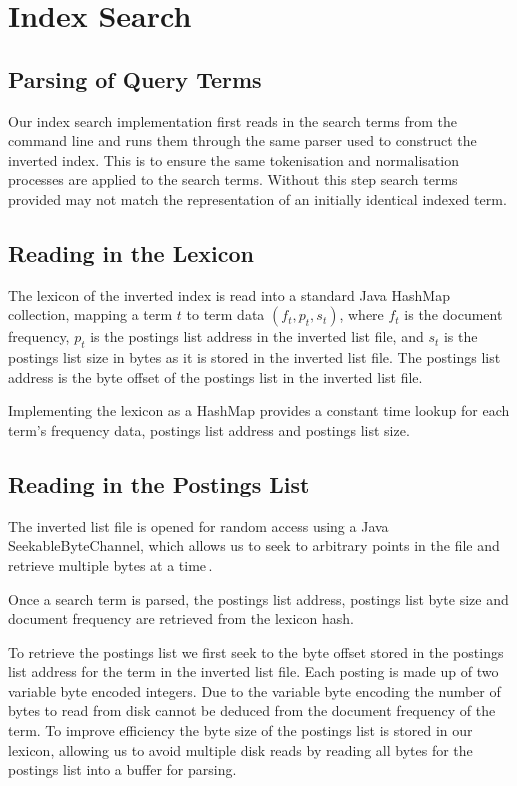 
\section{Index Search}
\label{sec:querying}

\subsection*{Parsing of Query Terms}

Our index search implementation first reads in the search terms from the command line and runs them through the same parser used to construct the inverted index. This is to ensure the same tokenisation and normalisation processes are applied to the search terms. Without this step search terms provided may not match the representation of an initially identical indexed term.

\subsection*{Reading in the Lexicon}

The lexicon of the inverted index is read into a standard Java HashMap collection, mapping a term $t$ to term data $(f_t, p_t, s_t)$, where $f_t$ is the document frequency, $p_t$ is the postings list address in the inverted list file, and $s_t$ is the postings list size in bytes as it is stored in the inverted list file. The postings list address is the byte offset of the postings list in the inverted list file.

Implementing the lexicon as a HashMap provides a constant time lookup for each term's frequency data, postings list address and postings list size.

\subsection*{Reading in the Postings List}

The inverted list file is opened for random access using a Java SeekableByteChannel, which allows us to seek to arbitrary points in the file and retrieve multiple bytes at a time\,\cite{seekablebytechannel}.

Once a search term is parsed, the postings list address, postings list byte size and document frequency are retrieved from the lexicon hash.

To retrieve the postings list we first seek to the byte offset stored in the postings list address for the term in the inverted list file. Each posting is made up of two variable byte encoded integers. Due to the variable byte encoding the number of bytes to read from disk cannot be deduced from the document frequency of the term. To improve efficiency the byte size of the postings list is stored in our lexicon, allowing us to avoid multiple disk reads by reading all bytes for the postings list into a buffer for parsing.

